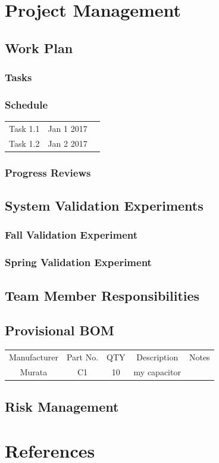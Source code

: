 \documentclass{article}
\begin{document}
\section{Project Management}
\subsection{Work Plan}
\subsubsection{Tasks}
\subsubsection{Schedule}
\begin{center}
\begin{tabular}{ |c|c|c| }
  \hline
    Task 1.1 & Jan 1 2017 \\
    Task 1.2 & Jan 2 2017 \\
  \hline
\end{tabular}
\end{center}

\subsubsection{Progress Reviews}

\subsection{System Validation Experiments}
\subsubsection{Fall Validation Experiment}
\subsubsection{Spring Validation Experiment}

\subsection{Team Member Responsibilities}
\subsection{Provisional BOM}
\begin{center}
\begin{tabular}{ |c|c|c|c|c| }
  \hline
    Manufacturer & Part No. & QTY & Description & Notes \\
    Murata & C1 & 10 & my capacitor &  \\
  \hline
\end{tabular}
\end{center}

\subsection{Risk Management}
\section{References}
\end{document}
